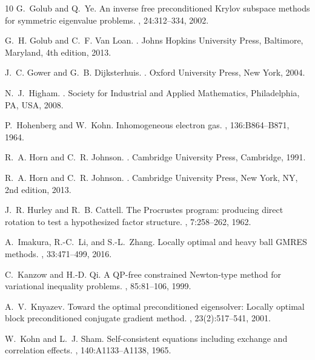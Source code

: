 \documentclass[11pt]{article}
\theoremstyle{definition}
\numberwithin{equation}{section}
\begin{document}
{\begin{thebibliography}{10}
G.~Golub and Q.~Ye.
\newblock An inverse free preconditioned {Krylov} subspace methods for
  symmetric eigenvalue problems.
, 24:312--334, 2002.

G.~H. Golub and C.~F. {Van Loan}.
.
\newblock Johns Hopkins University Press, Baltimore, Maryland, 4th edition,
  2013.

J.~C. Gower and G.~B. Dijksterhuis.
.
\newblock Oxford University Press, New York, 2004.

N.~J.~Higham.
.
\newblock Society for Industrial and Applied Mathematics, Philadelphia, PA,
  USA, 2008.

P.~Hohenberg and W.~Kohn.
\newblock Inhomogeneous electron gas.
, 136:B864--B871, 1964.

R.~A. Horn and C.~R. Johnson.
.
\newblock Cambridge University Press, Cambridge, 1991.

R.~A. Horn and C.~R. Johnson.
.
\newblock Cambridge University Press, New York, NY, 2nd edition, 2013.

J.~R. Hurley and R.~B. Cattell.
\newblock The {P}rocrustes program: producing direct rotation to test a
  hypothesized factor structure.
, 7:258--262, 1962.

A.~Imakura, R.-C.~Li, and S.-L.~Zhang.
\newblock Locally optimal and heavy ball {GMRES} methods.
, 33:471--499, 2016.

C.~Kanzow and H.-D. Qi.
\newblock A {QP}-free constrained {N}ewton-type method for variational
  inequality problems.
, 85:81--106, 1999.

A.~V.~Knyazev.
\newblock Toward the optimal preconditioned eigensolver: Locally optimal block
  preconditioned conjugate gradient method.
, 23(2):517--541, 2001.

W.~Kohn and L.~J. Sham.
\newblock Self-consistent equations including exchange and correlation effects.
, 140:A1133--A1138, 1965.


\end{thebibliography}}
\end{document}
